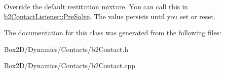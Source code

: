 Override the default restitution mixture. You can call this in \hyperlink{classb2_contact_listener_a416f85eb45a1099053402b15a19a7de0}{b2\+Contact\+Listener\+::\+Pre\+Solve}. The value persists until you set or reset. 

The documentation for this class was generated from the following files\+:\begin{DoxyCompactItemize}
\item 
Box2\+D/\+Dynamics/\+Contacts/b2\+Contact.\+h\item 
Box2\+D/\+Dynamics/\+Contacts/b2\+Contact.\+cpp\end{DoxyCompactItemize}
